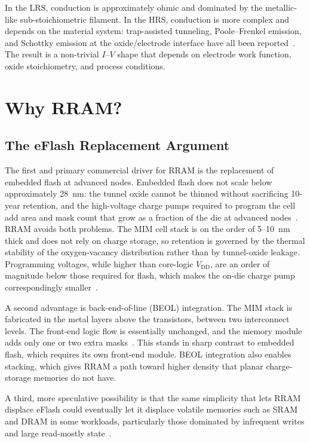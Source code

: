 \documentclass[lettersize,journal]{IEEEtran}
\begin{document}
In the LRS, conduction is approximately ohmic and dominated by the metallic-like sub-stoichiometric filament. In the HRS, conduction is more complex and depends on the material system: trap-assisted tunneling, Poole--Frenkel emission, and Schottky emission at the oxide/electrode interface have all been reported~\cite{ref_wong2012}. The result is a non-trivial $I$--$V$ shape that depends on electrode work function, oxide stoichiometry, and process conditions.

\section{Why RRAM?}\label{sec:why}

\subsection{The eFlash Replacement Argument}
The first and primary commercial driver for RRAM is the replacement of embedded flash at advanced nodes. Embedded flash does not scale below approximately 28~nm: the tunnel oxide cannot be thinned without sacrificing 10-year retention, and the high-voltage charge pumps required to program the cell add area and mask count that grow as a fraction of the die at advanced nodes~\cite{ref_hellenbrand2024}. RRAM avoids both problems. The MIM cell stack is on the order of 5--10~nm thick and does not rely on charge storage, so retention is governed by the thermal stability of the oxygen-vacancy distribution rather than by tunnel-oxide leakage. Programming voltages, while higher than core-logic $V_\mathrm{DD}$, are an order of magnitude below those required for flash, which makes the on-die charge pump correspondingly smaller~\cite{ref_wong2012,ref_hellenbrand2024}.

A second advantage is back-end-of-line (BEOL) integration. The MIM stack is fabricated in the metal layers above the transistors, between two interconnect levels. The front-end logic flow is essentially unchanged, and the memory module adds only one or two extra masks~\cite{ref_wong2012}. This stands in sharp contrast to embedded flash, which requires its own front-end module. BEOL integration also enables stacking, which gives RRAM a path toward higher density that planar charge-storage memories do not have.

A third, more speculative possibility is that the same simplicity that lets RRAM displace eFlash could eventually let it displace volatile memories such as SRAM and DRAM in some workloads, particularly those dominated by infrequent writes and large read-mostly state~\cite{ref_wong2012}.
\end{document}
